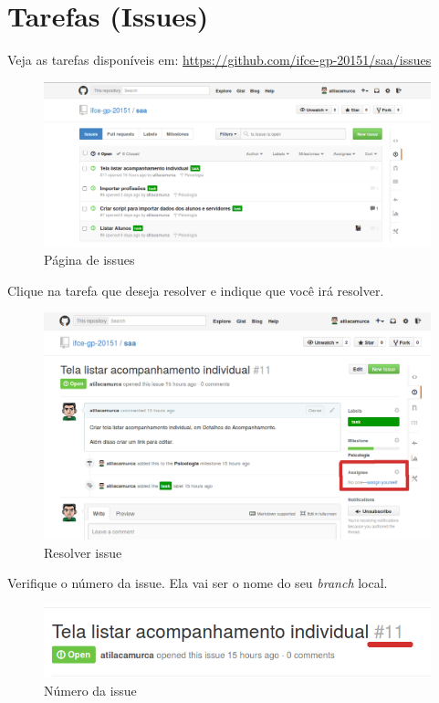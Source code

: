 \section{Tarefas (Issues)}\label{tarefas-issues}

Veja as tarefas disponíveis em:
\url{https://github.com/ifce-gp-20151/saa/issues}

\begin{figure}[H]
    \includegraphics[scale=0.4]{img/issues.png}
    \caption{Página de issues}
\end{figure}

Clique na tarefa que deseja resolver e indique que você irá resolver.

\begin{figure}[H]
    \includegraphics[scale=0.4]{img/resolver-issue.png}
    \caption{Resolver issue}
\end{figure}

Verifique o número da issue. Ela vai ser o nome do seu \emph{branch}
local.

\begin{figure}[H]
    \includegraphics[scale=0.5]{img/numero-issue.png}
    \caption{Número da issue}
\end{figure}

